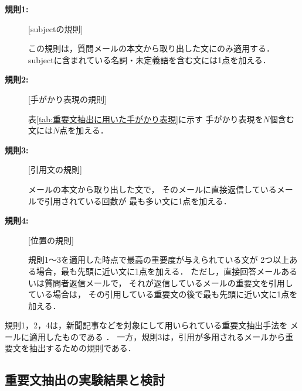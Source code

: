   \begin{description}
   \item[{\bf 規則1:}] [subjectの規則]

	      この規則は，質問メールの本文から取り出した文にのみ適用する．
	      subjectに含まれている名詞・未定義語を含む文には1点を加える．

   \item[{\bf 規則2:}] [手がかり表現の規則]

	      表\ref{tab:重要文抽出に用いた手がかり表現}に示す
	      手がかり表現を$N$個含む文には$N$点を加える．
   
   \item[{\bf 規則3:}] [引用文の規則]

	      メールの本文から取り出した文で，
	      そのメールに直接返信しているメールで引用されている回数が
	      最も多い文に1点を加える．

   \item[{\bf 規則4:}] [位置の規則]

	      規則1〜3を適用した時点で最高の重要度が与えられている文が
	      2つ以上ある場合，最も先頭に近い文に1点を加える．
	      ただし，直接回答メールあるいは質問者返信メールで，
	      それが返信しているメールの重要文を引用している場合は，
	      その引用している重要文の後で最も先頭に近い文に1点を加える．

  \end{description}
  規則1，2，4は，新聞記事などを対象にして用いられている重要文抽出手法を
  メールに適用したものである \cite{thesis:okumura99}．
  一方，規則3は，引用が多用されるメールから重要文を抽出するための規則である．


  \subsection{重要文抽出の実験結果と検討}
  
